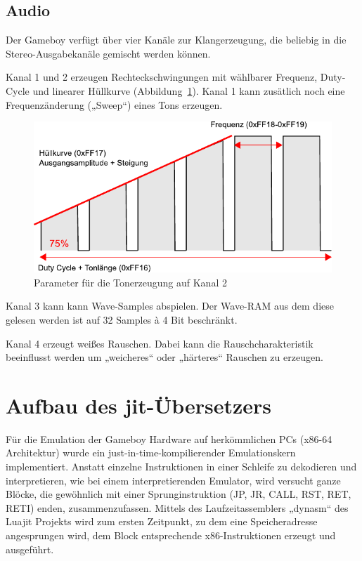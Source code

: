 \documentclass[a4paper]{scrartcl}
\begin{document}
\subsection{Audio}

Der Gameboy verfügt über vier Kanäle zur Klangerzeugung, die beliebig in die Stereo-Ausgabekanäle gemischt werden können.

Kanal 1 und 2 erzeugen Rechteckschwingungen mit wählbarer Frequenz, Duty-Cycle und linearer Hüllkurve (Abbildung~\ref{img:sound}). Kanal 1 kann zusätlich noch eine Frequenzänderung („Sweep“) eines Tons erzeugen.

\begin{figure}[htbp]
\centering
\includegraphics[width=0.9\linewidth]{img/sound}
\caption{Parameter für die Tonerzeugung auf Kanal 2}
\label{img:sound}
\end{figure}

Kanal 3 kann kann Wave-Samples abspielen. Der Wave-RAM aus dem diese gelesen werden ist auf 32 Samples à 4 Bit beschränkt.

Kanal 4 erzeugt weißes Rauschen. Dabei kann die Rauschcharakteristik beeinflusst werden um „weicheres“ oder „härteres“ Rauschen zu erzeugen.
\section{Aufbau des jit-Übersetzers}

Für die Emulation der Gameboy Hardware auf herkömmlichen PCs (x86-64 Architektur) wurde ein just-in-time-kompilierender Emulationskern implementiert. Anstatt einzelne Instruktionen in einer Schleife zu dekodieren und interpretieren, wie bei einem interpretierenden Emulator, wird versucht ganze Blöcke, die gewöhnlich mit einer Sprunginstruktion (JP, JR, CALL, RST, RET, RETI) enden, zusammenzufassen. Mittels des Laufzeitassemblers „dynasm“ des Luajit Projekts \cite{dynasm_unofficial}\cite{dynasm} wird zum ersten Zeitpunkt, zu dem eine Speicheradresse angesprungen wird, dem Block entsprechende x86-Instruktionen erzeugt und ausgeführt.
\end{document}
